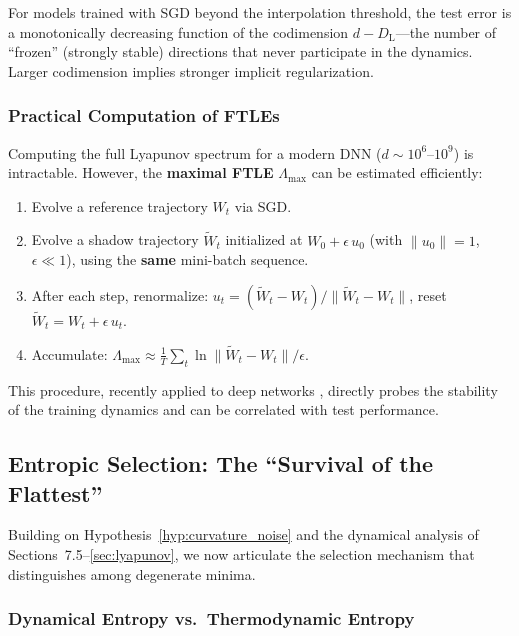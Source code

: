 \documentclass[
  journal=largetwo,
  simfonts=false,
  year=2025,
  volume=37,
]{cup-journal}
\begin{document}
\begin{conjecture}\label{conj:lyap_gen}
    For models trained with SGD beyond the interpolation threshold, the test error is a monotonically decreasing function of the codimension $d - D_{\mathrm{L}}$---the number of ``frozen'' (strongly stable) directions that never participate in the dynamics. Larger codimension implies stronger implicit regularization.
\end{conjecture}

\subsubsection{Practical Computation of FTLEs}

Computing the full Lyapunov spectrum for a modern DNN ($d \sim 10^6$--$10^9$) is intractable. However, the \textbf{maximal FTLE} $\Lambda_{\max}$ can be estimated efficiently:
\begin{enumerate}
    \item Evolve a reference trajectory $W_t$ via SGD.
    \item Evolve a shadow trajectory $\tilde{W}_t$ initialized at $W_0 + \epsilon \, u_0$ (with $\|u_0\| = 1$, $\epsilon \ll 1$), using the \textbf{same} mini-batch sequence.
    \item After each step, renormalize: $u_t = (\tilde{W}_t - W_t) / \|\tilde{W}_t - W_t\|$, reset $\tilde{W}_t = W_t + \epsilon \, u_t$.
    \item Accumulate: $\Lambda_{\max} \approx \frac{1}{T}\sum_{t} \ln \|\tilde{W}_t - W_t\| / \epsilon$.
\end{enumerate}
This procedure, recently applied to deep networks \cite{cohen2021gradient}, directly probes the stability of the training dynamics and can be correlated with test performance.

\subsection{Entropic Selection: The ``Survival of the Flattest''}\label{sec:entropic}

Building on Hypothesis~\ref{hyp:curvature_noise} and the dynamical analysis of Sections~7.5--\ref{sec:lyapunov}, we now articulate the selection mechanism that distinguishes among degenerate minima.

\subsubsection{Dynamical Entropy vs.\ Thermodynamic Entropy}
\end{document}
